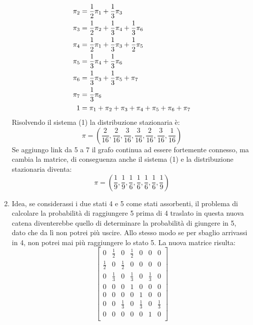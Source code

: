 \documentclass{oxmathproblems}
\begin{document}
\begin{questions}
\begin{solution}
\begin{enumerate}[label=(\alph*)]
\begin{equation}
\begin{split}
                \pi\sb{2} &=   \frac{1}{2}\pi\sb{1} +  \frac{1}{3}\pi\sb{3}\\
                \pi\sb{3} &=  \frac{1}{2}\pi\sb{2}  + \frac{1}{3}\pi\sb{4} + \frac{1}{3} \pi\sb{6}\\
                \pi\sb{4} &=  \frac{1}{2}\pi\sb{1} +  \frac{1}{3}\pi\sb{3} + \frac{1}{2}\pi\sb{5}\\
                \pi\sb{5} &=   \frac{1}{3}\pi\sb{4} +  \frac{1}{3}\pi\sb{6}\\
                \pi\sb{6} &=  \frac{1}{3}\pi\sb{3}  + \frac{1}{3}\pi\sb{5} + \pi\sb{7}\\
                \pi\sb{7} &=  \frac{1}{3}\pi\sb{6} \\
                 1        &=  \pi\sb{1} + \pi\sb{2} + \pi\sb{3} +  \pi\sb{4} + \pi\sb{5}  + \pi\sb{6} +\pi\sb{7}  \\ 
            \end{split}
        \end{equation}
    Risolvendo il sistema (1) la distribuzione stazionaria è:
    \[
        \pi = (\frac{2}{16},\frac{2}{16},\frac{3}{16},\frac{3}{16},\frac{2}{16},\frac{3}{16},\frac{1}{16} )
    \]
    Se aggiungo link da 5 a 7 il grafo continua ad essere fortemente connesso, ma cambia la matrice, di conseguenza anche il sistema (1) e la distribuzione stazionaria diventa:
    \[
        \pi = (\frac{1}{9},\frac{1}{9},\frac{1}{6},\frac{1}{6},\frac{1}{6},\frac{1}{6},\frac{1}{9} )
    \]
    
    \item Idea, se considerassi i due stati 4 e 5 come stati assorbenti, il problema di calcolare la probabilità di raggiungere 5 prima di 4 traslato in questa nuova catena diventerebbe quello di determinare la probabilità di giungere in 5, dato che da lì non potrei più uscire. Allo stesso modo se per sbaglio arrivassi in 4, non potrei mai più raggiungere lo stato 5.
    La nuova matrice risulta:
    $$
    \begin{bmatrix}
            0 & \frac{1}{2} & 0 & \frac{1}{2} & 0 & 0 & 0\\
            \frac{1}{2} & 0 & \frac{1}{2} & 0 & 0 & 0 & 0\\
            0 & \frac{1}{3} & 0 & \frac{1}{3} & 0 & \frac{1}{3} & 0\\
            0 & 0 & 0 & 1 & 0 & 0 & 0\\
            0 & 0 & 0 & 0 & 1 & 0 & 0\\
            0 & 0 & \frac{1}{3} & 0 & \frac{1}{3} & 0 & \frac{1}{3}\\
            0 & 0 & 0 & 0 & 0 & 1 & 0\\
    \end{bmatrix}
    $$
    

\end{enumerate}
\end{solution}
\end{questions}
\end{document}
